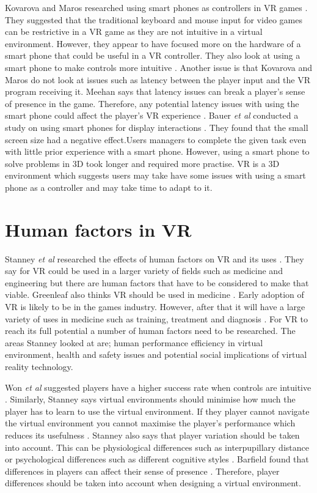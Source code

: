 \documentclass{scrartcl}
\begin{document}
Kovarova and Maros researched using smart phones as controllers in VR games \cite{Kovarova}. They suggested that the traditional keyboard and mouse input for video games can be restrictive in a VR game as they are not intuitive in a virtual environment. However, they appear to have focused more on the hardware of a smart phone that could be useful in a VR controller. They also look at using a smart phone to make controls more intuitive \cite{Kovarova}.
Another issue is that Kovarova and Maros do not look at issues such as latency between the player input and the VR program receiving it.  Meehan says that latency issues can break a player's sense of presence in the game. Therefore, any potential latency issues with using the smart phone could affect the player's VR experience \cite{Meehan}.
Bauer \textit{et al} conducted a study on using smart phones for display interactions \cite{Bauer}. They found that the small screen size had a negative effect.Users managers to complete the given task even with little prior experience with a smart phone. However, using a smart phone to solve problems in 3D took longer and required more practise. VR is a 3D environment which suggests users may take have some issues with using a smart phone as a controller and may take time to adapt to it. 

\section{Human factors in VR}
Stanney \textit{et al} researched the effects of human factors on VR and its uses \cite{stanney}. They say for VR could be used in a larger variety of fields such as medicine and engineering but there are human factors that have to be considered to make that viable. Greenleaf also thinks VR should be used in medicine \cite{Greenleaf}. Early adoption of VR is likely to be in the games industry. However, after that it will have a large variety of uses in medicine such as training, treatment and diagnosis \cite{Greenleaf}.  For VR to reach its full potential a number of human factors need to be researched. The areas Stanney looked at are; human performance efficiency in virtual environment, health and safety issues and potential social implications of virtual reality technology.  

Won \textit{et al} suggested players have a higher success rate when controls are intuitive \cite{won2015homuncular}. Similarly, Stanney   says virtual environments should minimise how much the player has to learn to use the virtual environment. If they player cannot navigate the virtual environment you cannot maximise the player's performance which reduces its usefulness \cite{stanney}.  Stanney also says that player variation should be taken into account. This can be physiological differences such as interpupillary distance or psychological differences such as different cognitive styles \cite{stanney}. Barfield found that differences in players can affect their sense of presence \cite{barfield1993sense}. Therefore, player differences should be taken into account when designing a virtual environment.
\end{document}
